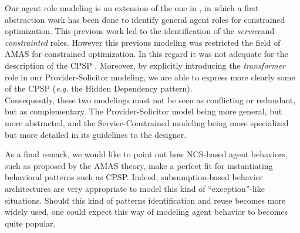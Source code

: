 Our agent role modeling is an extension of the one in \cite{Ka2011.6}, in which a first abstraction work has been done to identify general agent roles for constrained optimization. This previous work led to the identification of the \emph{service}and \emph{constrainted} roles. However this previous modeling was restricted the field of AMAS for constrained optimization. In this regard it was not adequate for the description of the CPSP . Moreover, by explicitly introducing the \emph{transformer} role in our Provider-Solicitor modeling, we are able to express more clearly some of the CPSP (\emph{e.g.} the Hidden Dependency pattern).\\
Consequently, these two modelings must not be seen as conflicting or redundant, but as complementary. The Provider-Solicitor model being more general, but more abstracted, and the Service-Constrained modeling being more specialized but more detailed in its guidelines to the designer.

As a final remark, we would like to point out how NCS-based agent behaviors, such as proposed by the AMAS theory, make a perfect fit for instantiating behavioral patterns such as CPSP. Indeed, subsumption-based behavior architectures are very appropriate to model this kind of \enquote{exception}-like situations. Should this kind of patterns identification and reuse becomes more widely used, one could expect this way of modeling agent behavior to becomes quite popular.
